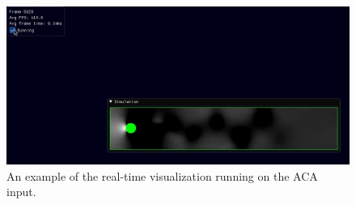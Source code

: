 \begin{figure}[ht]
    \centering
    \centerline{\includegraphics[width=1.25\linewidth]{Ch48Implementation/figures/example_running.png}}
    \caption{An example of the real-time visualization running on the ACA input.}
    \label{fig:ExampleRunning}
\end{figure}
